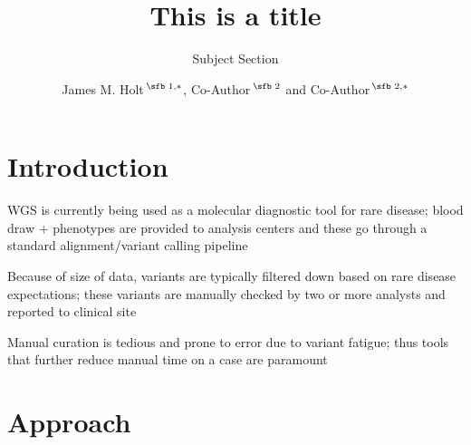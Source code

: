 \documentclass{bioinfo}
\begin{document}

\subtitle{Subject Section}

\title[short Title]{This is a title}
\author[Holt \textit{et~al}.]{James M. Holt\,$^{\text{\sfb 1,}*}$, Co-Author\,$^{\text{\sfb 2}}$ and Co-Author\,$^{\text{\sfb 2,}*}$}
\address{$^{\text{\sf 1}}$Department, Institution, City, Post Code, Country and \\
$^{\text{\sf 2}}$Department, Institution, City, Post Code,
Country.}





\maketitle

\section{Introduction}
WGS is currently being used as a molecular diagnostic tool for rare disease; blood draw + phenotypes are provided to analysis centers and these go through a standard alignment/variant calling pipeline

Because of size of data, variants are typically filtered down based on rare disease expectations; these variants are manually checked by two or more analysts and reported to clinical site

Manual curation is tedious and prone to error due to variant fatigue; thus tools that further reduce manual time on a case are paramount


\section{Approach}
\end{document}
